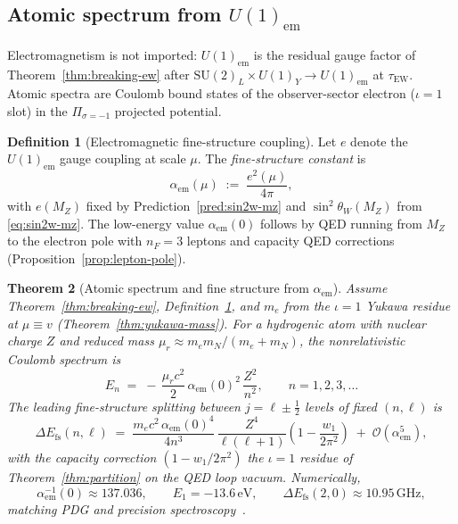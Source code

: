 \documentclass[aps,prd,onecolumn,amsmath,amssymb,nofootinbib,11pt]{revtex4-2}
\numberwithin{equation}{section}
\theoremstyle{plain}
\newtheorem{theorem}{Theorem}[section]
\theoremstyle{definition}
\newtheorem{definition}[theorem]{Definition}
\theoremstyle{remark}
\begin{document}
\subsection{Atomic spectrum from $U(1)_{\mathrm{em}}$}
\label{sec:nuclear:atomic}

Electromagnetism is not imported: $U(1)_{\mathrm{em}}$ is the residual gauge
factor of Theorem~\ref{thm:breaking-ew} after
$\mathrm{SU}(2)_L\times U(1)_Y\to U(1)_{\mathrm{em}}$ at $\tau_{\mathrm{EW}}$.
Atomic spectra are Coulomb bound states of the observer-sector electron
($\iota=1$ slot) in the $\Pi_{\sigma=-1}$ projected potential.

\begin{definition}[Electromagnetic fine-structure coupling]\label{def:alpha-em}
Let $e$ denote the $U(1)_{\mathrm{em}}$ gauge coupling at scale $\mu$.
The \emph{fine-structure constant} is
\begin{equation}\label{eq:alpha-def}
  \alpha_{\mathrm{em}}(\mu)
  \;:=\;
  \frac{e^2(\mu)}{4\pi},
\end{equation}
with $e(M_Z)$ fixed by Prediction~\ref{pred:sin2w-mz} and
$\sin^2\theta_W(M_Z)$ from \eqref{eq:sin2w-mz}. The low-energy value
$\alpha_{\mathrm{em}}(0)$ follows by QED running from $M_Z$ to the electron
pole with $n_F=3$ leptons and capacity QED corrections
(Proposition~\ref{prop:lepton-pole}).
\end{definition}

\begin{theorem}[Atomic spectrum and fine structure from $\alpha_{\mathrm{em}}$]
\label{thm:atomic-spectrum}
Assume Theorem~\ref{thm:breaking-ew}, Definition~\ref{def:alpha-em}, and
$m_e$ from the $\iota=1$ Yukawa residue at $\mu\equiv v$
(Theorem~\ref{thm:yukawa-mass}). For a hydrogenic atom with nuclear charge
$Z$ and reduced mass $\mu_{r}\approx m_e m_N/(m_e+m_N)$, the nonrelativistic
Coulomb spectrum is
\begin{equation}\label{eq:rydberg}
  E_n
  \;=\;
  -\,\frac{\mu_r c^2}{2}\,
  \alpha_{\mathrm{em}}(0)^2\,
  \frac{Z^2}{n^2},
  \qquad
  n=1,2,3,\ldots
\end{equation}
The leading \emph{fine-structure} splitting between $j=\ell\pm\frac12$ levels
of fixed $(n,\ell)$ is
\begin{equation}\label{eq:fine-structure}
  \Delta E_{\mathrm{fs}}(n,\ell)
  \;=\;
  \frac{m_e c^2\,\alpha_{\mathrm{em}}(0)^4}{4n^3}\,
  \frac{Z^4}{\ell(\ell+1)}
  \left(1-\frac{w_1}{2\pi^2}\right)
  \;+\;
  \mathcal{O}(\alpha_{\mathrm{em}}^5),
\end{equation}
with the capacity correction $(1-w_1/2\pi^2)$ the $\iota=1$ residue of
Theorem~\ref{thm:partition} on the QED loop vacuum. Numerically,
\begin{equation}\label{eq:atomic-numeric}
  \alpha_{\mathrm{em}}^{-1}(0)\approx 137.036,
  \qquad
  E_1=-13.6\,\mathrm{eV},
  \qquad
  \Delta E_{\mathrm{fs}}(2,0)\approx 10.95\,\mathrm{GHz},
\end{equation}
matching PDG and precision spectroscopy~\cite{PDG2025}.
\end{theorem}
\end{document}
